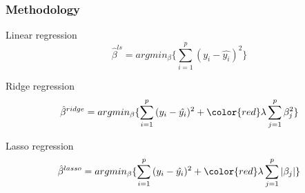 \documentclass{beamer}
\begin{document}
\begin{frame}
\frametitle{Methodology}
%
\begin{block}{Linear regression}
\begin{equation}
\hat{\beta}^{ls}=argmin_{\beta}\{\sum_{i=1}^p{(y_i-\hat{y_i})^2}\}
\end{equation}
\end{block}
\begin{block}{Ridge regression}
\begin{equation}
\hat{\beta}^{ridge}=argmin_{\beta}\{\sum_{i=1}^p{(y_i-\hat{y_i})^2}+{\color{red}\lambda \sum_{j=1}^p\beta_j^2}\}
\end{equation}
\end{block}

\begin{block}{Lasso regression}
\begin{equation}
\hat{\beta}^{lasso}=argmin_{\beta}\{\sum_{i=1}^p{(y_i-\hat{y_i})^2}+{\color{red}\lambda\sum_{j=1}^p |\beta_j|}\}
\end{equation}
\end{block}

\end{frame}
\end{document}

